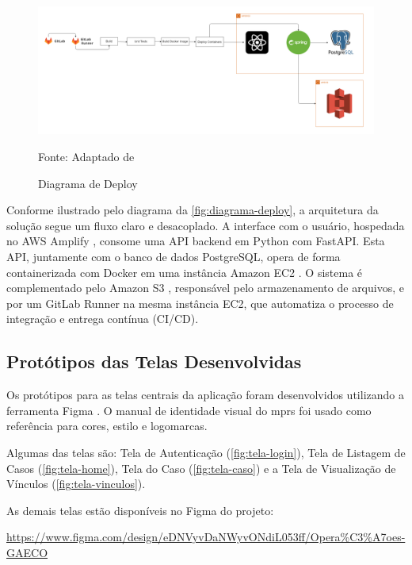   \begin{figure}[H]
    \centering
    \small
    \includegraphics[width=1\linewidth]{conteudo//2 - ages I//conteudo//figures//Diagrama_de_Deploy.png}
    \caption{Diagrama de Deploy}
    Fonte: Adaptado de \textcites{wiki-Operacoes GAECO}
    \label{fig:diagrama-deploy}
  \end{figure}

  Conforme ilustrado pelo diagrama da \autoref{fig:diagrama-deploy}, a arquitetura da solução segue um fluxo claro e desacoplado. A interface com o usuário, hospedada no AWS Amplify \cite{amplify}, consome uma API backend em Python \cite{python} com FastAPI. Esta API, juntamente com o banco de dados PostgreSQL, opera de forma containerizada com Docker \cite{docker} em uma instância Amazon EC2 \cite{ec2}. O sistema é complementado pelo Amazon S3 \cite{s3}, responsável pelo armazenamento de arquivos, e por um GitLab Runner \cite{gitlabrunner} na mesma instância EC2, que automatiza o processo de integração e entrega contínua (CI/CD).

\subsection{Protótipos das Telas Desenvolvidas}
  Os protótipos para as telas centrais da aplicação foram desenvolvidos utilizando a ferramenta Figma \cite{figma}. O manual de identidade visual do \acs{mprs} foi usado como referência para cores, estilo e logomarcas. 
  
  Algumas das telas são: Tela de Autenticação (\autoref{fig:tela-login}), Tela de Listagem de Casos (\autoref{fig:tela-home}), Tela do Caso (\autoref{fig:tela-caso}) e a Tela de Visualização de Vínculos (\autoref{fig:tela-vinculos}).

  As demais telas estão disponíveis no Figma do projeto:
  
  \url{https://www.figma.com/design/eDNVyvDaNWyvONdiL053ff/Opera%C3%A7oes-GAECO}

